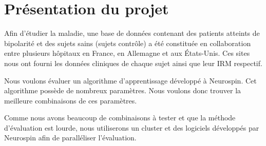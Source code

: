 \section{Présentation du projet}


Afin d'étudier la maladie, une base de données contenant des patients atteints de bipolarité et des sujets sains (sujets contrôle) a été constituée
en collaboration entre plusieurs hôpitaux en France, en Allemagne et aux États-Unis.
Ces sites nous ont fourni les données cliniques de chaque sujet ainsi que leur IRM respectif.

Nous voulons évaluer un algorithme d'apprentissage développé à Neurospin.
Cet algorithme possède de nombreux paramètres.
Nous voulons donc trouver la meilleure combinaisons de ces paramètres.

Comme nous avons beaucoup de combinaisons à tester et que la méthode d'évaluation est lourde,
nous utiliserons un cluster et des logiciels développés par Neurospin afin de paralléliser l'évaluation.

